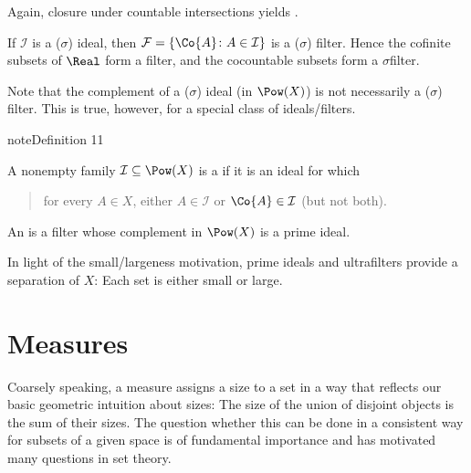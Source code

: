 \documentclass[letterpaper,10pt,english]{jupyterBook}
\begin{document}
\sphinxAtStartPar
Again, closure under countable intersections yields .

\sphinxAtStartPar
If \(\mathcal{I}\) is a (\(\sigma\)\sphinxhyphen{}) ideal, then \(\mathcal{F} = \{\Co{A} \colon A \in \mathcal{I}\}\) is a (\(\sigma\)\sphinxhyphen{}) filter. Hence the co\sphinxhyphen{}finite subsets of \(\Real\) form a filter, and the co\sphinxhyphen{}countable subsets form a \(\sigma\)\sphinxhyphen{}filter.

\sphinxAtStartPar
Note that the complement of a (\(\sigma\)\sphinxhyphen{}) ideal (in \(\Pow(X)\)) is not necessarily a (\(\sigma\)\sphinxhyphen{}) filter. This is true, however, for a special class of ideals/filters.
\label{measure:def-ultrafilter}
\begin{sphinxadmonition}{note}{Definition 11}



\sphinxAtStartPar
A non\sphinxhyphen{}empty family \(\mathcal{I} \subseteq \Pow(X)\) is a  if it is an ideal for which
\begin{quote}

\sphinxAtStartPar
for every \(A \in X\), either \(A\in \mathcal{I}\) or \(\Co{A} \in \mathcal{I}\) (but not both).
\end{quote}

\sphinxAtStartPar
An  is a filter whose complement in \(\Pow(X)\) is a prime ideal.
\end{sphinxadmonition}

\sphinxAtStartPar
In light of the small\sphinxhyphen{}/largeness motivation, prime ideals and ultrafilters provide a  separation of \(X\): Each set is either small or large.


\section{Measures}
\label{\detokenize{measure:measures}}
\sphinxAtStartPar
Coarsely speaking, a measure assigns a size to a set in a way that reflects our basic geometric intuition about sizes: The size of the union of disjoint objects is the sum of their sizes. The question whether this can be done in a consistent way for  subsets of a given space is of fundamental importance and has motivated many questions in set theory.
\end{document}
